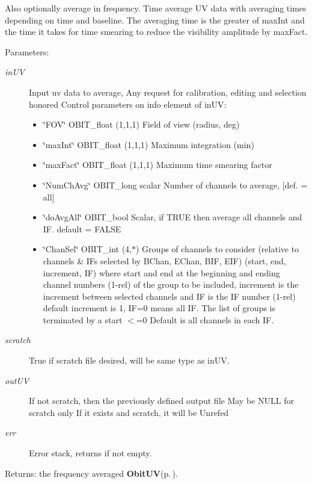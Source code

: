 Also optionally average in frequency. Time average UV data with averaging times depending on time and baseline. The averaging time is the greater of max\-Int and the time it takes for time smearing to reduce the visibility amplitude by max\-Fact. \begin{Desc}
\item[Parameters:]
\begin{description}
\item[{\em in\-UV}]Input uv data to average, Any request for calibration, editing and selection honored Control parameters on info element of in\-UV: \begin{itemize}
\item \char`\"{}FOV\char`\"{} OBIT\_\-float (1,1,1) Field of view (radius, deg) \item \char`\"{}max\-Int\char`\"{} OBIT\_\-float (1,1,1) Maximum integration (min) \item \char`\"{}max\-Fact\char`\"{} OBIT\_\-float (1,1,1) Maximum time smearing factor \item \char`\"{}Num\-Ch\-Avg\char`\"{} OBIT\_\-long scalar Number of channels to average, [def. = all] \item \char`\"{}do\-Avg\-All\char`\"{} OBIT\_\-bool Scalar, if TRUE then average all channels and IF. default = FALSE \item \char`\"{}Chan\-Sel\char`\"{} OBIT\_\-int (4,$\ast$) Groups of channels to consider (relative to channels \& IFs selected by BChan, EChan, BIF, EIF) (start, end, increment, IF) where start and end at the beginning and ending channel numbers (1-rel) of the group to be included, increment is the increment between selected channels and IF is the IF number (1-rel) default increment is 1, IF=0 means all IF. The list of groups is terminated by a start $<$=0 Default is all channels in each IF.\end{itemize}
\item[{\em scratch}]True if scratch file desired, will be same type as in\-UV. \item[{\em out\-UV}]If not scratch, then the previously defined output file May be NULL for scratch only If it exists and scratch, it will be Unrefed \item[{\em err}]Error stack, returns if not empty. \end{description}
\end{Desc}
\begin{Desc}
\item[Returns:]the frequency averaged {\bf Obit\-UV}{\rm (p.\,\pageref{structObitUV})}. \end{Desc}
